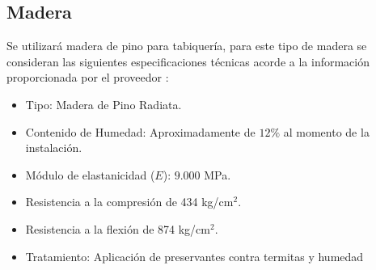 \subsection{Madera}
Se utilizará madera de pino para tabiquería, para este tipo de madera se consideran las siguientes especificaciones técnicas acorde a la información proporcionada por el proveedor \cite{maderea_pino_radiata}:
\begin{itemize}
    \item Tipo: Madera de Pino Radiata.
    \item Contenido de Humedad: Aproximadamente de $12\%$ al momento de la instalación.
    \item Módulo de elastanicidad ($E$): $9.000$ MPa.
    \item Resistencia a la compresión de 434 kg/cm$^2$.
    \item Resistencia a la flexión de 874 kg/cm$^2$.
    \item Tratamiento: Aplicación de preservantes contra termitas y humedad
\end{itemize}